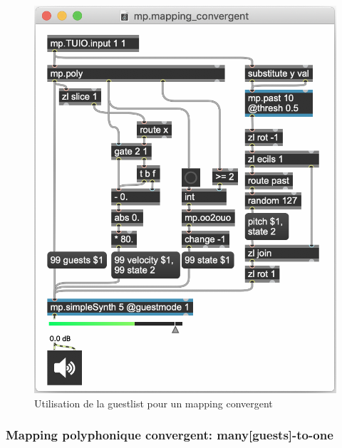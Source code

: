 \begin{figure}[!htbp]
\begin{minipage}[t]{0.58\textwidth}
	  	\includegraphics[width=\linewidth]{gfx/04_algorithms/MP-mappingConvergent.png}
		\caption[Exemple de patch MP : guestlist]{Utilisation de la guestlist pour un mapping convergent}
		\label{fig:algorithms:MP-convergent}
	\end{minipage}
\end{figure}


\subsubsection*{Mapping polyphonique convergent: many[guests]-to-one}
\label{sec:algorithms:many-guests-to-one}

